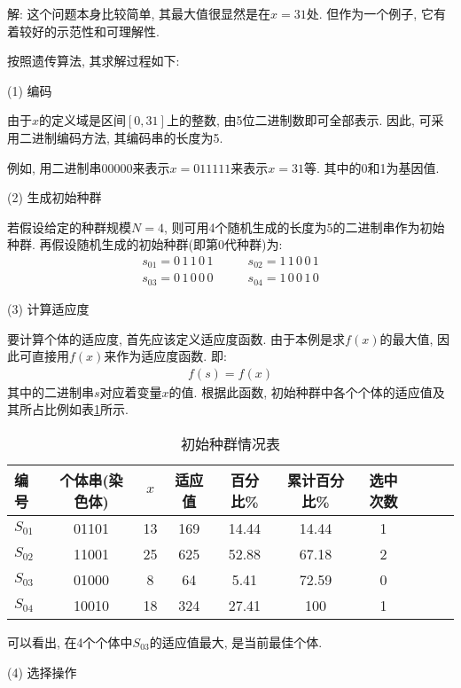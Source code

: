 {解: 这个问题本身比较简单, 其最大值很显然是在$x=31$处. 但作为一个例子, 它有着较好的示范性和可理解性.

按照遗传算法, 其求解过程如下:

    (1) 编码

    由于$x$的定义域是区间$[0,31]$上的整数, 由5位二进制数即可全部表示. 因此, 可采用二进制编码方法, 其编码串的长度为5.

    例如, 用二进制串00000来表示$x=011111$来表示$x=31$等. 其中的0和1为基因值.

    (2) 生成初始种群

    若假设给定的种群规模$N=4$, 则可用4个随机生成的长度为5的二进制串作为初始种群. 再假设随机生成的初始种群(即第0代种群)为:
\begin{align*}
  s_{01}=0\,  1\,  1\,  0\,  1 \qquad    & s_{02}=1\,  1\,  0\,  0\,  1\\
  s_{03}=0\,  1\,  0\,  0\,  0 \qquad    &  s_{04}=1\,  0\,  0\,  1\,  0
\end{align*}

 (3) 计算适应度

要计算个体的适应度, 首先应该定义适应度函数. 由于本例是求$f(x)$的最大值, 因此可直接用$f(x)$来作为适应度函数. 即:
\begin{align}
  f(s)=f(x)
\end{align}
其中的二进制串$s$对应着变量$x$的值. 根据此函数, 初始种群中各个个体的适应值及其所占比例如表\ref{AI_table2019112802}所示.
\begin{table}[H]
\caption{初始种群情况表}
\begin{center}
\begin{tabular} {lccccccccc}
  \hline
编号&个体串(染色体)&	$x$	&适应值&	百分比\%&	累计百分比\%&	选中次数\\
\hline
$S_{01}$&     01101&	13&	169&	14.44&	14.44&	1\\
$S_{02}$&	11001&	25&	625&	52.88&	67.18&	2\\
$S_{03}$&	01000&	8&	64&	5.41&	72.59&	0\\
$S_{04}$&	10010&	18&	324&	27.41&	100&	1\\
\hline
\end{tabular}
\end{center}
\label{AI_table2019112802}
\end{table}
可以看出, 在4个个体中$S_{03}$的适应值最大, 是当前最佳个体.

(4) 选择操作

}
